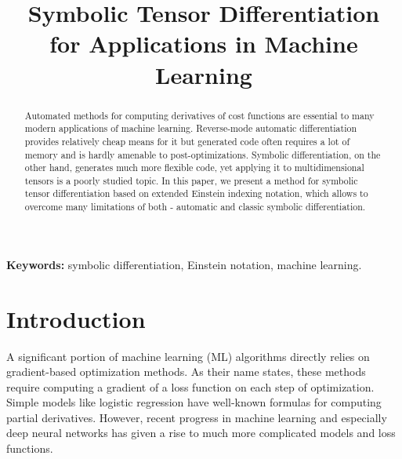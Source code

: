 \documentclass[conference]{IEEEtran}
\begin{document}
\title{Symbolic Tensor Differentiation \\ for Applications in Machine
  Learning}


\author{   \and {} }

\maketitle


\begin{abstract}
  Automated methods for computing derivatives of cost functions are
  essential to many modern applications of machine
  learning. Reverse-mode automatic differentiation provides relatively
  cheap means for it but generated code often requires a lot of memory
  and is hardly amenable to post-optimizations. Symbolic
  differentiation, on the other hand, generates much more flexible
  code, yet applying it to multidimensional tensors is a poorly
  studied topic. In this paper, we present a method for symbolic
  tensor differentiation based on extended Einstein indexing notation,
  which allows to overcome many limitations of both - automatic and
  classic symbolic differentiation.


\end{abstract}

\textbf{Keywords:} symbolic differentiation, Einstein notation,
machine learning.

\IEEEpeerreviewmaketitle


\section{Introduction}

A significant portion of machine learning (ML) algorithms directly
relies on gradient-based optimization methods. As their name states,
these methods require computing a gradient of a loss function on each
step of optimization. Simple models like logistic regression have
well-known formulas for computing partial derivatives. However, recent
progress in machine learning and especially deep neural networks has
given a rise to much more complicated models and loss functions.
\end{document}
